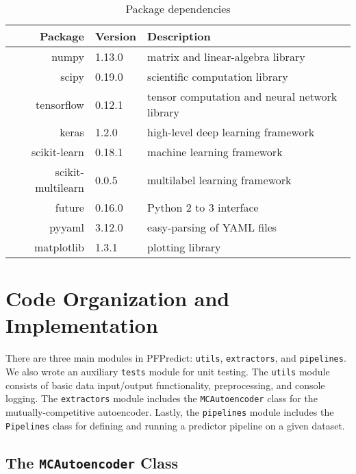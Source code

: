 \begin{table}[!h]
\centering
\caption{Package dependencies}
\label{my-label}
\begin{tabular}{@{}rlp{}@{}}
\toprule
Package           & Version & Description                                    \\ \midrule
numpy             & 1.13.0  & matrix and linear-algebra library              \\
scipy             & 0.19.0  & scientific computation library                 \\
tensorflow        & 0.12.1  & tensor computation and neural network library  \\
keras             & 1.2.0   & high-level deep learning framework             \\
scikit-learn      & 0.18.1  & machine learning framework                     \\
scikit-multilearn & 0.0.5   & multilabel learning framework                  \\
future            & 0.16.0  & Python 2 to 3 interface                        \\
pyyaml            & 3.12.0  & easy-parsing of YAML files                     \\
matplotlib        & 1.3.1   & plotting library                               \\ \bottomrule
\end{tabular}
\end{table}


\section{Code Organization and Implementation}

\par There are three main modules in PFPredict: \texttt{utils},
\texttt{extractors}, and \texttt{pipelines}. We also wrote an auxiliary
\texttt{tests} module for unit testing. The \texttt{utils} module consists of
basic data input/output functionality, preprocessing, and console logging.  The
\texttt{extractors} module includes the \texttt{MCAutoencoder} class for the
mutually-competitive autoencoder. Lastly, the \texttt{pipelines} module
includes the \texttt{Pipelines} class for defining and running a predictor
pipeline on a given dataset.

\subsection{The \texttt{MCAutoencoder} Class}

